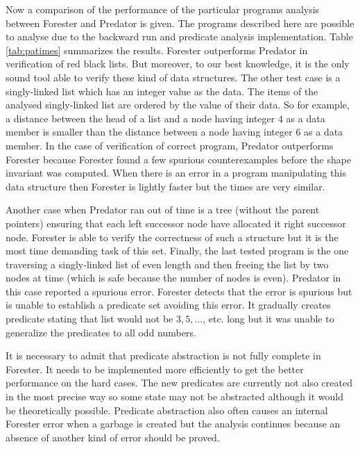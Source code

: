 Now a comparison of the performance of the particular programs analysis 
between Forester and Predator is given.
The programs described here are possible to analyse due to the
backward run and predicate analysis implementation.
Table \ref{tab:patimes} summarizes the results.
Forester outperforms Predator in verification of red black lists.
But moreover, to our best knowledge, it is the only sound tool able to verify these
kind of data structures.
The other test case is a singly-linked list which
has an integer value as the data.
The items of the analysed singly-linked list are ordered
by the value of their data.
So for example, a distance between the head of a list and a 
node having integer $4$ as a data member is smaller than
the distance between a node having integer $6$ as a data member.
In the case of verification of correct program, Predator outperforms Forester
because Forester found a few spurious counterexamples
before the shape invariant was computed.
When there is an error in a program manipulating this
data structure then Forester is lightly faster
but the times are very similar.

Another case when Predator ran out of time
is a tree (without the parent pointers) ensuring
that each left successor node have allocated it
right successor node.
Forester is able to verify the correctness of such a structure
but it is the most time demanding task of this set.
Finally, the last tested program is the one traversing
a singly-linked list of even length and then
freeing the list by two nodes at time (which is safe because
the number of nodes is even).
Predator in this case reported a spurious error.
Forester detects that the error is spurious but is
unable to establish a predicate set avoiding this error.
It gradually creates predicate stating that list would not
be $3, 5, \ldots$, etc. long but it was unable to generalize
the predicates to all odd numbers.

It is necessary to admit that predicate abstraction
is not fully complete in Forester.
It needs to be implemented more efficiently to get the better
performance on the hard cases.
The new predicates are currently not also created in the most
precise way so some state may not be abstracted
although it would be theoretically possible.
Predicate abstraction also often causes an internal
Forester error when a garbage is created but the
analysis continues because an absence of another
kind of error should be proved.


